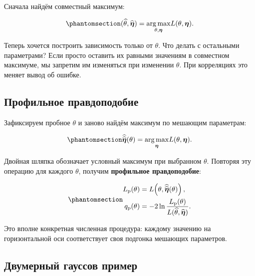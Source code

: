 \documentclass[
  russian,
  11pt,
  a4paper,
  open=any]{scrbook}
\begin{document}
Сначала найдём совместный максимум:

\begin{equation}\protect\phantomsection\label{eq-ch10-joint-mle}{
(\widehat\theta,\widehat{\boldsymbol\eta})
=\underset{\theta,\boldsymbol\eta}{\operatorname{arg\,max}}
L(\theta,\boldsymbol\eta).
}\end{equation}

Теперь хочется построить зависимость только от \(\theta\). Что делать с
остальными параметрами? Если просто оставить их равными значениям в
совместном максимуме, мы запретим им изменяться при изменении
\(\theta\). При корреляциях это меняет вывод об ошибке.

\subsection{Профильное
правдоподобие}\label{ux43fux440ux43eux444ux438ux43bux44cux43dux43eux435-ux43fux440ux430ux432ux434ux43eux43fux43eux434ux43eux431ux438ux435}

Зафиксируем пробное \(\theta\) и заново найдём максимум по мешающим
параметрам:

\begin{equation}\protect\phantomsection\label{eq-ch10-conditional-nuisance-mle}{
\widehat{\widehat{\boldsymbol\eta}}(\theta)
=\underset{\boldsymbol\eta}{\operatorname{arg\,max}}
L(\theta,\boldsymbol\eta).
}\end{equation}

Двойная шляпка обозначает условный максимум при выбранном \(\theta\).
Повторяя эту операцию для каждого \(\theta\), получим \textbf{профильное
правдоподобие}:

\begin{equation}\protect\phantomsection\label{eq-ch10-profile-likelihood}{
\begin{aligned}
L_{\mathrm p}(\theta)
&=L\!\left(\theta,\widehat{\widehat{\boldsymbol\eta}}(\theta)\right),\\
q_{\mathrm p}(\theta)
&=-2\ln\frac{L_{\mathrm p}(\theta)}
{L(\widehat\theta,\widehat{\boldsymbol\eta})}.
\end{aligned}
}\end{equation}

Это вполне конкретная численная процедура: каждому значению на
горизонтальной оси соответствует своя подгонка мешающих параметров.

\subsection{Двумерный гауссов
пример}\label{interactive-likelihood-profile}
\end{document}
